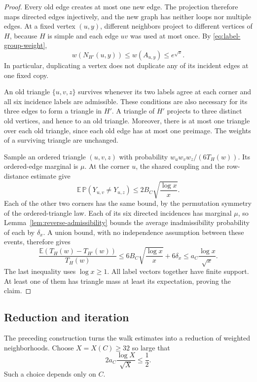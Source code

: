 \begin{proof}
Every old edge creates at most one new edge. The projection therefore
maps directed edges injectively, and the new graph has neither loops
nor multiple edges. At a fixed vertex $(u,y)$, different neighbors
project to different vertices of $H$, because $H$ is simple and each
edge $uv$ was used at most once.  By \eqref{eq:label-group-weight},
\[
 w(N_{H'}(u,y))
 \le w(A_{u,y})
 \le e^{\sqrt x}.
\]
In particular, duplicating a vertex does not duplicate any of its
incident edges at one fixed copy.

An old triangle $\{u,v,z\}$ survives whenever its two labels agree
at each corner and all six incidence labels are admissible. These
conditions are also necessary for its three edges to form a triangle
in $H'$. A triangle of $H'$ projects to three distinct old vertices,
and hence to an old triangle. Moreover, there is at most one triangle
over each old triangle, since each old edge has at most one preimage.
The weights of a surviving triangle are unchanged.

Sample an ordered triangle $(u,v,z)$ with probability
$w_uw_vw_z/(6T_H(w))$. Its ordered-edge marginal is $\mu$.
At the corner $u$, the shared coupling and the row-distance estimate
give
\[
 \mathbb E\,\mathbb P(Y_{u,v}\ne Y_{u,z})
 \le 2B_C\sqrt{\frac{\log x}{x}}.
\]
Each of the other two corners has the same bound, by the permutation
symmetry of the ordered-triangle law. Each of its six directed
incidences has marginal $\mu$, so
Lemma~\ref{lem:reverse-admissibility} bounds the average
inadmissibility probability of each by $\delta_x$.
A union bound, with no independence assumption between these events,
therefore gives
\[
 \frac{\mathbb E(T_H(w)-T_{H'}(w))}{T_H(w)}
 \le6B_C\sqrt{\frac{\log x}{x}}+6\delta_x
 \le a_C\frac{\log x}{\sqrt x}.
\]
The last inequality uses $\log x\ge1$. All label vectors together
have finite support. At least one of them has triangle mass at least
its expectation, proving the claim.
\end{proof}

\subsection{Reduction and iteration}

The preceding construction turns the walk estimates into a reduction
of weighted neighborhoods. Choose $X=X(C)\ge32$ so large that
\begin{equation}\label{eq:iteration-threshold}
 2a_C\frac{\log X}{\sqrt X}\le\frac12.
\end{equation}
Such a choice depends only on $C$.

